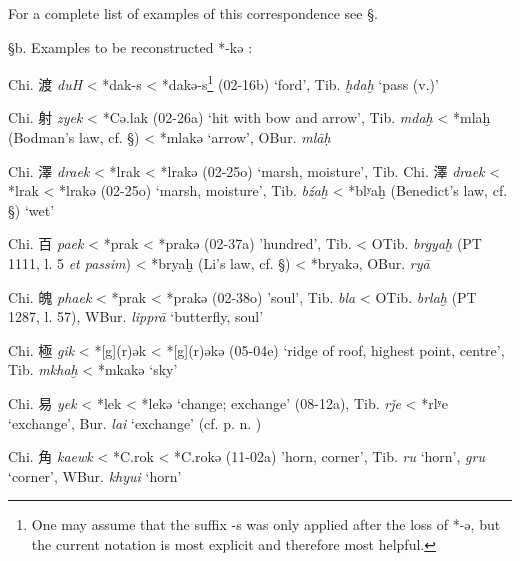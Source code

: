 For a complete list of examples of this correspondence see §.

§b. Examples to be reconstructed *-kə :

\begin{description} 
\item
Chi. 渡  \emph{duH} \textless{} *d{}ak-s \textless{} *d{}akə-s\footnote{One
  may assume that the suffix -s was only applied after the loss of *-ə,
  but the current notation is most explicit and therefore most helpful.}
(02-16b) `ford', Tib. {} \emph{ḫdaḫ} `pass (v.)'

\item
Chi. 射  \emph{zyek} \textless{} *Cə.lak (02-26a) `hit with bow and
arrow', Tib. {} \emph{mdaḫ} \textless{} *mlaḫ (Bodman's law, cf. §)
\textless{} *mlakə `arrow', OBur. {} \emph{mlāḥ}
\item
Chi. 澤  \emph{draek} \textless{} *l{}rak \textless{} *l{}rakə (02-25o)
`marsh, moisture', Tib. %
Chi. 澤
 \emph{draek} \textless{} *l{}rak \textless{} *l{}rakə (02-25o) `marsh,
moisture', Tib. {} \emph{bźaḫ }\textless{} *blʸaḫ (Benedict's law, cf.
§) `wet'
\item
Chi. 百 \emph{paek} \textless{} *p{}rak \textless{} *p{}rakə (02-37a)
'hundred', Tib. {} \textless{} OTib. {} \emph{brgyaḫ} (PT 1111, l.
5 \emph{et passim}) \textless{} *bryaḫ (Li's law, cf. §) \textless{}
*bryakə, OBur. {} \emph{ryā}
\item
Chi. 魄  \emph{phaek} \textless{} *p{}{}rak \textless{} *p{}{}rakə (02-38o)
'soul', Tib. {} \emph{bla} \textless{} OTib. {} \emph{brlaḫ} (PT
1287, l. 57), WBur. {} \emph{lipprā} `butterfly, soul'
\item
Chi. 極  \emph{gik} \textless{} *[g](r)ək \textless{} *[g](r)əkə
(05-04e) `ridge of roof, highest point, centre', Tib. {} \emph{mkhaḫ}
\textless{} *mkakə `sky'
\item
Chi. 易  \emph{yek} \textless{} *lek \textless{} *lekə `change; exchange'
(08-12a), Tib. {} \emph{rǰe} \textless{} *rlʸe `exchange', Bur. {} \emph{lai} `exchange' (cf. p. n. )
\item
Chi. 角  \emph{kaewk} \textless{} *C.{}rok \textless{} *C.{}rokə (11-02a)
'horn, corner', Tib. {} \emph{ru} `horn', {} \emph{gru} `corner',
WBur. {} \emph{khyui} `horn'


\end{description}
